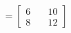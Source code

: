 \documentclass[preview]{standalone}
\begin{document}
\begin{align*}
=\begin{bmatrix} 6 & \quad 10 \\ 8 & \quad 12 \end{bmatrix}
\end{align*}
\end{document}
